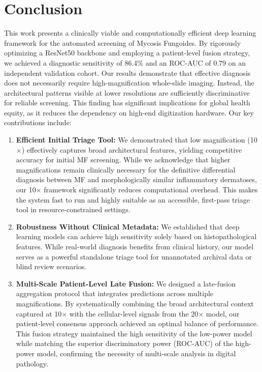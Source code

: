 \documentclass[runningheads]{llncs}
\begin{document}
\section{Conclusion}
This work presents a clinically viable and computationally efficient deep learning framework for the automated screening of Mycosis Fungoides. By rigorously optimizing a ResNet50 backbone and employing a patient-level fusion strategy, we achieved a diagnostic sensitivity of 86.4\% and an ROC-AUC of 0.79 on an independent validation cohort. Our results demonstrate that effective diagnosis does not necessarily require high-magnification whole-slide imaging. Instead, the architectural patterns visible at lower resolutions are sufficiently discriminative for reliable screening. This finding has significant implications for global health equity, as it reduces the dependency on high-end digitization hardware. Our key contributions include:

\begin{enumerate}
    \item \textbf{Efficient Initial Triage Tool:} We demonstrated that low magnification (10$\times$) effectively captures broad architectural features, yielding competitive accuracy for initial MF screening. While we acknowledge that higher magnifications remain clinically necessary for the definitive differential diagnosis between MF and morphologically similar inflammatory dermatoses, our 10$\times$ framework significantly reduces computational overhead. This makes the system fast to run and highly suitable as an accessible, first-pass triage tool in resource-constrained settings.
    \item \textbf{Robustness Without Clinical Metadata:} We established that deep learning models can achieve high sensitivity solely based on histopathological features. While real-world diagnosis benefits from clinical history, our model serves as a powerful standalone triage tool for unannotated archival data or blind review scenarios.
    \item \textbf{Multi-Scale Patient-Level Late Fusion:} We designed a late-fusion aggregation protocol that integrates predictions across multiple magnifications. By systematically combining the broad architectural context captured at 10$\times$ with the cellular-level signals from the 20$\times$ model, our patient-level consensus approach achieved an optimal balance of performance. This fusion strategy maintained the high sensitivity of the low-power model while matching the superior discriminatory power (ROC-AUC) of the high-power model, confirming the necessity of multi-scale analysis in digital pathology.
\end{enumerate}
\end{document}
